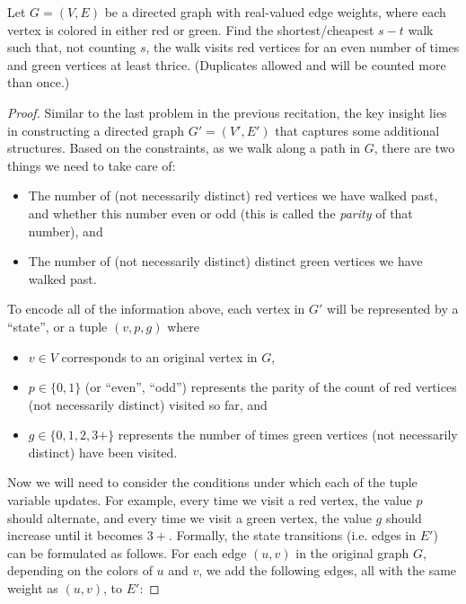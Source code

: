 \documentclass{article}
\begin{document}
    \begin{exercise}
      Let $G=(V,E)$ be a directed graph with real-valued edge weights, where each vertex is colored in either {\color{red} red} or {\color{dkgreen} green}. Find the shortest/cheapest $s-t$ walk such that, not counting $s$, the walk visits red vertices for an even number of times and green vertices at least thrice. (Duplicates allowed and will be counted more than once.)
    \end{exercise}
    \begin{proof}
      Similar to the last problem in the previous recitation, the key insight lies in constructing a directed graph $G'=(V', E')$ that captures some additional structures. Based on the constraints, as we walk along a path in $G$, there are two things we need to take care of: 
      \begin{itemize}
        \item The number of (not necessarily distinct) red vertices we have walked past, and whether this number even or odd (this is called the \textit{parity} of that number), and
        \item The number of (not necessarily distinct) distinct green vertices we have walked past. 
      \end{itemize}
      To encode all of the information above, each vertex in $G'$ will be represented by a ``state'', or a tuple $(v, p, g)$ where
      \begin{itemize}
        \item $v\in V$ corresponds to an original vertex in $G$,
        \item $p\in \{0,1\}$ (or ``even'', ``odd'') represents the parity of the count of red vertices (not necessarily distinct) visited so far, and
        \item $g \in \{0,1,2,3+\}$ represents the number of times green vertices (not necessarily distinct) have been visited.
      \end{itemize}

      Now we will need to consider the conditions under which each of the tuple variable updates. For example, every time we visit a red vertex, the value $p$ should alternate, and every time we visit a green vertex, the value $g$ should increase until it becomes $3+$. Formally, the state transitions (i.e. edges in $E'$) can be formulated as follows. For each edge $(u,v)$ in the original graph $G$, depending on the colors of $u$ and $v$, we add the following edges, all with the same weight as $(u,v)$, to $E'$:


\end{proof}
\end{document}

